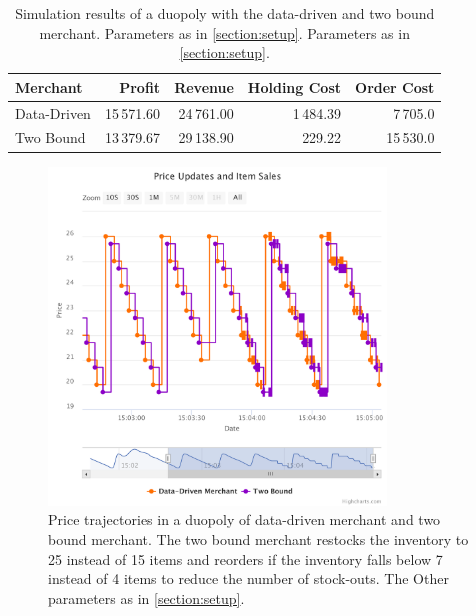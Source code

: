 \begin{table}[t]
	\centering
	\begin{tabular}{lrrrr}
		\toprule
		\textbf{Merchant} & \textbf{Profit} & \textbf{Revenue} & \textbf{Holding Cost} & \textbf{Order Cost} \\
		\midrule
		Data-Driven & 15\,571.60 & 24\,761.00 & 1\,484.39 & 7\,705.0 \\
		Two Bound & 13\,379.67 & 29\,138.90 & 229.22 & 15\,530.0 \\
		\bottomrule
	\end{tabular}
	\caption[Simulation Results: Data-Driven Merchant versus Two Bound Merchant]{Simulation results of a duopoly with the data-driven and two bound merchant. Parameters as in \cref{section:setup}. Parameters as in \cref{section:setup}.}
	\label{tab:duopoly_bound}
\end{table}


\begin{figure}[t]
	\centering
	\includegraphics[width=0.8\textwidth]{figures/duopoly_bound_prices_2}
	\caption[Price Trajectories: Data-Driven Merchant versus Two Bound Merchant with Larger Inventory]{Price trajectories in a duopoly of data-driven merchant and two bound merchant. The two bound merchant restocks the inventory to 25 instead of 15 items and reorders if the inventory falls below 7 instead of 4 items to reduce the number of stock-outs. The Other parameters as in \cref{section:setup}.}
	\label{fig:duopoly_bound_prices_2}
\end{figure}

